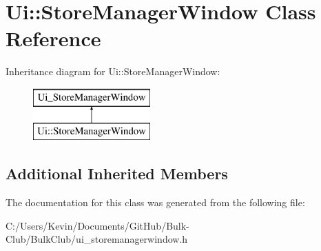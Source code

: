 \hypertarget{class_ui_1_1_store_manager_window}{}\section{Ui\+:\+:Store\+Manager\+Window Class Reference}
\label{class_ui_1_1_store_manager_window}
Inheritance diagram for Ui\+:\+:Store\+Manager\+Window\+:\begin{figure}[H]
\begin{center}
\leavevmode
\includegraphics[height=2.000000cm]{class_ui_1_1_store_manager_window}
\end{center}
\end{figure}
\subsection*{Additional Inherited Members}


The documentation for this class was generated from the following file\+:\begin{DoxyCompactItemize}
\item 
C\+:/\+Users/\+Kevin/\+Documents/\+Git\+Hub/\+Bulk-\/\+Club/\+Bulk\+Club/ui\+\_\+storemanagerwindow.\+h\end{DoxyCompactItemize}
